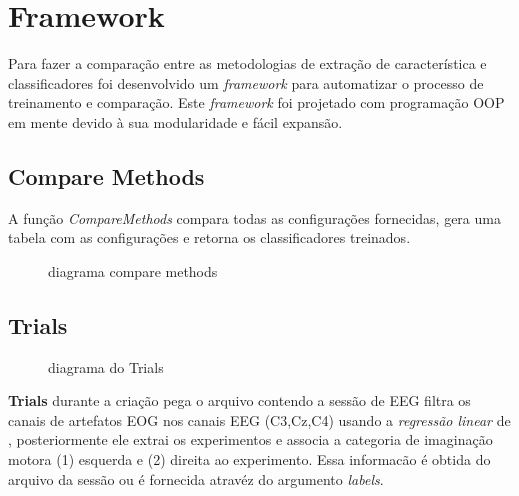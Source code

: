 \section{Framework}
\par
Para fazer a compara\c{c}\~ao entre as metodologias  de extra\c{c}\~ao de caracter\'istica e classificadores foi desenvolvido um \textit{framework} para automatizar o processo de treinamento e compara\c{c}\~ao. Este \textit{framework} foi projetado com programa\c{c}\~ao \ac{OOP} em mente devido \`a sua modularidade e f\'acil expans\~ao.
\subsection{Compare Methods}
A fun\c{c}\~ao \textit{CompareMethods} compara todas as configura\c{c}\~oes fornecidas, gera uma tabela com as configura\c{c}\~oes e retorna os classificadores treinados.
\begin{figure}[h!]
	\caption{diagrama compare methods}	
	\centering
	
	\label{fig:comparemethods}
\end{figure}
\subsection{Trials}
\begin{figure}[h!]
	\caption{diagrama do Trials}	
	\centering
	
	\label{fig:Trials}
\end{figure}
%		
\textbf{Trials} durante a cria\c{c}\~ao pega o arquivo contendo a sess\~ao de \ac{EEG} filtra os canais de artefatos \ac{EOG} nos canais \ac{EEG} (C3,Cz,C4) usando a \textit{regress\~ao linear} de \cite{EOG2006}, posteriormente ele extrai os experimentos e associa a categoria de imagina\c{c}\~ao motora (1) esquerda e (2) direita ao experimento. Essa informac\~ao \'e obtida do arquivo da sess\~ao ou \'e fornecida atrav\'ez do argumento \textit{labels}.
